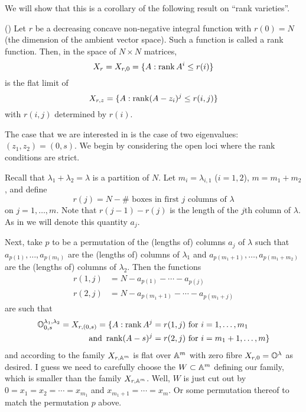 \documentclass[draft]{article}
\begin{document}
We will show that this is a corollary of the following result on ``rank varieties''. 

\begin{theorem}(\cite{eisenbud1989rank})
Let $r$ be a decreasing concave non-negative integral function with $r(0) = N$ (the dimension of the ambient vector space). Such a function is called a rank function. Then, in the space of $N\times N$ matrices, 
$$X_r = X_{r,0} = \{A:\rk A^i \le r(i) \}$$ 
is the flat limit of 
$$X_{r,z} = \{A : \rk (A-z_i)^j\le r(i,j)\}$$
with $r(i,j)$ determined by $r(i)$.  
\end{theorem}

The case that we are interested in is the case of two eigenvalues: $(z_1,z_2) = (0,s)$.  
We begin by considering the open loci where the rank conditions are strict. 

Recall that $\lambda_1 + \lambda_2 = \lambda$ is a partition of $N$. 
Let $m_i = \lambda_{i,1}$ ($i = 1,2$), $m = m_1 + m_2$, and define
$$r(j) = N - \#\text{~boxes in first $j$ columns of }\lambda$$
on $j = 1,\dots,m$. Note that $r(j-1) - r(j)$ is the length of the $j$th column of $\lambda$. As in \cite{eisenbud1989rank} we will denote this quantity $a_j$. 
% 

Next, take $p$ to be a permutation of the (lengths of) columns $a_j$ of $\lambda$ such that $a_{p(1)},\dots,a_{p(m_1)}$ are the (lengths of) columns of $\lambda_1$ and $a_{p(m_1 + 1)},\dots, a_{p(m_1 + m_2)}$ are the (lengths of) columns of $\lambda_2$. 
Then the functions 
$$
\begin{aligned}
r(1,j) &= N - a_{p(1)} - \cdots - a_{p(j)} \\
r(2,j) &= N - a_{p(m_1 + 1)} - \cdots - a_{p(m_1 + j)}
\end{aligned}
$$
are such that 
\begin{align*}
    \OO^{\lambda_1,\lambda_2}_{0,s} = X_{r,(0,s)} = \{A:\rk A^j &= r(1,j) \text{ for } i = 1,\dots, m_1 \\ \text{ and } \rk (A-s)^j &= r(2,j) \text{ for } i = m_1 + 1 ,\dots, m \}
\end{align*}
and according to \cite[Theorem 2.1(iii)]{eisenbud1989rank} the family $X_{r,\AA^m}$ is flat over $\AA^m$ with zero fibre $X_{r,0} = \OO^\lambda$ as desired. I guess we need to carefully choose the $W \subset \AA^m$ defining our family, which is smaller than the family $X_{r,\AA^m}$. Well, $W$ is just cut out by $0 = x_1 = x_2 = \cdots = x_{m_1}$ and $ x_{m_1 + 1} = \cdots = x_m$. Or some permutation thereof to match the permutation $p$ above.
 
\end{document}
